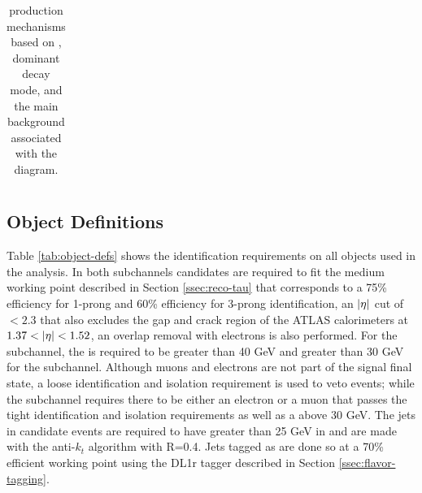 \begin{table}[!thp]
{\begin{tabular}{| c | c | c | c |}
			\end{tabular}}
			\caption{\Hpm production mechanisms based on \mHpm, dominant \Hpm decay mode, and the main background associated with the diagram.}
			\label{tab:hplus-production}
		\end{table}

		\subsection{Object Definitions}\label{ssec:object-def}
		Table \ref{tab:object-defs} shows the identification requirements on all objects used in the analysis. In both subchannels \tauhad candidates are required to fit the medium working point described in Section \ref{ssec:reco-tau} that corresponds to a 75\% efficiency for 1-prong and 60\% efficiency for 3-prong \tauhad identification, an $|{\eta}|$ cut of $< 2.3$ that also excludes the gap and crack region of the ATLAS calorimeters at $1.37 < |{\eta}| < 1.52$, an overlap removal with electrons is also performed. For the \taujets subchannel, the \tauhad \pt is required to be greater than 40 GeV and greater than 30 GeV for the \taulep subchannel. Although muons and electrons are not part of the \taujets signal final state, a loose identification and isolation requirement is used to veto events; while the \taulep subchannel requires there to be either an electron or a muon that passes the tight identification and isolation requirements as well as a \pt above 30 GeV. The jets in candidate events are required to have greater than 25 GeV in \pt and are made with the anti-$k_t$ algorithm with R=0.4. Jets tagged as \bjets are done so at a 70\% efficient working point using the DL1r tagger described in Section \ref{ssec:flavor-tagging}.


